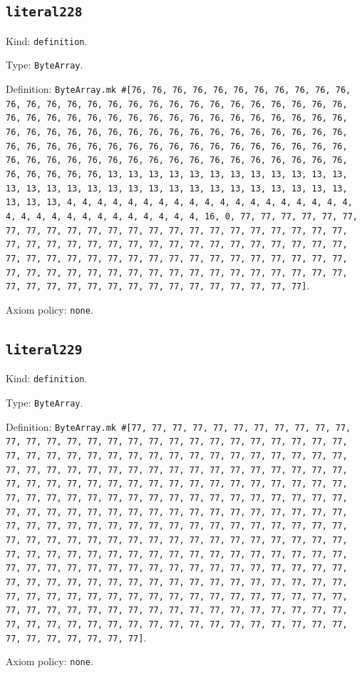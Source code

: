\documentclass[11pt]{article}
\begin{document}
\subsection*{\texttt{literal228}}
\noindent Kind: \texttt{definition}.\par
\noindent Type: \texttt{ByteArray}.\par
\noindent Definition: \texttt{ByteArray.mk \#[76, 76, 76, 76, 76, 76, 76, 76, 76, 76, 76, 76, 76, 76, 76, 76, 76, 76, 76, 76, 76, 76, 76, 76, 76, 76, 76, 76, 76, 76, 76, 76, 76, 76, 76, 76, 76, 76, 76, 76, 76, 76, 76, 76, 76, 76, 76, 76, 76, 76, 76, 76, 76, 76, 76, 76, 76, 76, 76, 76, 76, 76, 76, 76, 76, 76, 76, 76, 76, 76, 76, 76, 76, 76, 76, 76, 76, 76, 76, 76, 76, 76, 76, 76, 76, 76, 76, 76, 76, 76, 76, 76, 76, 76, 76, 76, 76, 76, 76, 76, 76, 13, 13, 13, 13, 13, 13, 13, 13, 13, 13, 13, 13, 13, 13, 13, 13, 13, 13, 13, 13, 13, 13, 13, 13, 13, 13, 13, 13, 13, 13, 13, 13, 4, 4, 4, 4, 4, 4, 4, 4, 4, 4, 4, 4, 4, 4, 4, 4, 4, 4, 4, 4, 4, 4, 4, 4, 4, 4, 4, 4, 4, 4, 4, 4, 16, 0, 77, 77, 77, 77, 77, 77, 77, 77, 77, 77, 77, 77, 77, 77, 77, 77, 77, 77, 77, 77, 77, 77, 77, 77, 77, 77, 77, 77, 77, 77, 77, 77, 77, 77, 77, 77, 77, 77, 77, 77, 77, 77, 77, 77, 77, 77, 77, 77, 77, 77, 77, 77, 77, 77, 77, 77, 77, 77, 77, 77, 77, 77, 77, 77, 77, 77, 77, 77, 77, 77, 77, 77, 77, 77, 77, 77, 77, 77, 77, 77, 77, 77, 77, 77, 77, 77, 77, 77, 77]}.\par
\noindent Axiom policy: \texttt{none}.\par
\subsection*{\texttt{literal229}}
\noindent Kind: \texttt{definition}.\par
\noindent Type: \texttt{ByteArray}.\par
\noindent Definition: \texttt{ByteArray.mk \#[77, 77, 77, 77, 77, 77, 77, 77, 77, 77, 77, 77, 77, 77, 77, 77, 77, 77, 77, 77, 77, 77, 77, 77, 77, 77, 77, 77, 77, 77, 77, 77, 77, 77, 77, 77, 77, 77, 77, 77, 77, 77, 77, 77, 77, 77, 77, 77, 77, 77, 77, 77, 77, 77, 77, 77, 77, 77, 77, 77, 77, 77, 77, 77, 77, 77, 77, 77, 77, 77, 77, 77, 77, 77, 77, 77, 77, 77, 77, 77, 77, 77, 77, 77, 77, 77, 77, 77, 77, 77, 77, 77, 77, 77, 77, 77, 77, 77, 77, 77, 77, 77, 77, 77, 77, 77, 77, 77, 77, 77, 77, 77, 77, 77, 77, 77, 77, 77, 77, 77, 77, 77, 77, 77, 77, 77, 77, 77, 77, 77, 77, 77, 77, 77, 77, 77, 77, 77, 77, 77, 77, 77, 77, 77, 77, 77, 77, 77, 77, 77, 77, 77, 77, 77, 77, 77, 77, 77, 77, 77, 77, 77, 77, 77, 77, 77, 77, 77, 77, 77, 77, 77, 77, 77, 77, 77, 77, 77, 77, 77, 77, 77, 77, 77, 77, 77, 77, 77, 77, 77, 77, 77, 77, 77, 77, 77, 77, 77, 77, 77, 77, 77, 77, 77, 77, 77, 77, 77, 77, 77, 77, 77, 77, 77, 77, 77, 77, 77, 77, 77, 77, 77, 77, 77, 77, 77, 77, 77, 77, 77, 77, 77, 77, 77, 77, 77, 77, 77, 77, 77, 77, 77, 77, 77, 77, 77, 77, 77, 77, 77, 77, 77, 77, 77, 77, 77]}.\par
\noindent Axiom policy: \texttt{none}.\par
\end{document}
